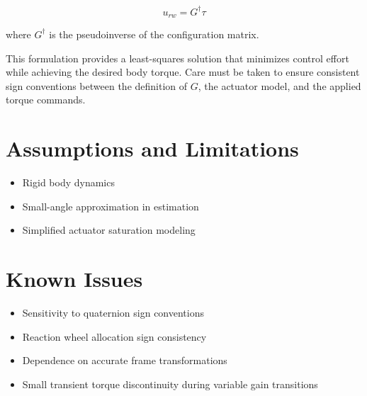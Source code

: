 \[
u_{rw} = G^\dagger \tau
\]

where $G^\dagger$ is the pseudoinverse of the configuration matrix.

This formulation provides a least-squares solution that minimizes control effort while achieving the desired body torque. Care must be taken to ensure consistent sign conventions between the definition of $G$, the actuator model, and the applied torque commands.

\section{Assumptions and Limitations}

\begin{itemize}
	\item Rigid body dynamics
	\item Small-angle approximation in estimation
	\item Simplified actuator saturation modeling
\end{itemize}

\section{Known Issues}

\begin{itemize}
	\item Sensitivity to quaternion sign conventions
	\item Reaction wheel allocation sign consistency
	\item Dependence on accurate frame transformations
	\item Small transient torque discontinuity during variable gain transitions
\end{itemize}